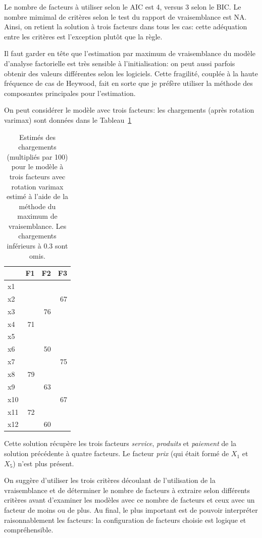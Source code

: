 \documentclass[
  11pt,
  letterpaper,
]{scrbook}
\theoremstyle{definition}
\theoremstyle{remark}
\begin{document}
Le nombre de facteurs à utiliser selon le AIC est 4, versus 3 selon le
BIC. Le nombre mimimal de critères selon le test du rapport de
vraisemblance est NA. Ainsi, on retient la solution à trois facteurs
dans tous les cas: cette adéquation entre les critères est l'exception
plutôt que la règle.

Il faut garder en tête que l'estimation par maximum de vraisemblance du
modèle d'analyse factorielle est très sensible à l'initialisation: on
peut aussi parfois obtenir des valeurs différentes selon les logiciels.
Cette fragilité, couplée à la haute fréquence de cas de Heywood, fait en
sorte que je préfère utiliser la méthode des composantes principales
pour l'estimation.

On peut considérer le modèle avec trois facteurs: les chargements (après
rotation varimax) sont données dans le Tableau~\ref{tbl-factanal3}

\hypertarget{tbl-factanal3}{}
\begin{table}
\caption{\label{tbl-factanal3}Estimés des chargements (multipliés par 100) pour le modèle à trois
facteurs avec rotation varimax estimé à l'aide de la méthode du maximum
de vraisemblance. Les chargements inférieurs à 0.3 sont omis. }\tabularnewline

\centering
\begin{tabular}{lrrr}
\toprule
  & F1 & F2 & F3\\
\midrule
x1 &  &  & \\
x2 &  &  & 67\\
x3 &  & 76 & \\
x4 & 71 &  & \\
x5 &  &  & \\
\addlinespace
x6 &  & 50 & \\
x7 &  &  & 75\\
x8 & 79 &  & \\
x9 &  & 63 & \\
x10 &  &  & 67\\
\addlinespace
x11 & 72 &  & \\
x12 &  & 60 & \\
\bottomrule
\end{tabular}
\end{table}

Cette solution récupère les trois facteurs \emph{service},
\emph{produits} et \emph{paiement} de la solution précédente à quatre
facteurs. Le facteur \emph{prix} (qui était formé de \(X_1\) et \(X_5\))
n'est plus présent.

On suggère d'utiliser les trois critères découlant de l'utilisation de
la vraisemblance et de déterminer le nombre de facteurs à extraire selon
différents critères avant d'examiner les modèles avec ce nombre de
facteurs et ceux avec un facteur de moins ou de plus. Au final, le plus
important est de pouvoir interpréter raisonnablement les facteurs: la
configuration de facteurs choisie est logique et compréhensible.
\end{document}
